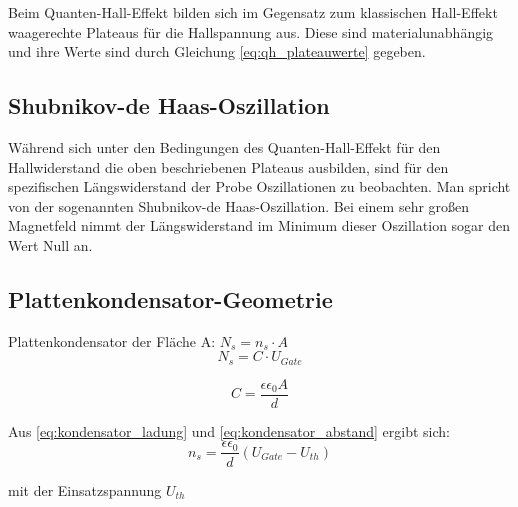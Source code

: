 Beim Quanten-Hall-Effekt bilden sich im Gegensatz zum klassischen Hall-Effekt waagerechte Plateaus für die Hallspannung aus. Diese sind materialunabhängig und ihre Werte sind durch Gleichung \ref{eq:qh_plateauwerte} gegeben. 





\subsection{Shubnikov-de Haas-Oszillation}

Während sich unter den Bedingungen des Quanten-Hall-Effekt für den Hallwiderstand die oben beschriebenen Plateaus ausbilden, sind für den spezifischen Längswiderstand der Probe Oszillationen zu beobachten. Man spricht von der sogenannten Shubnikov-de Haas-Oszillation. Bei einem sehr großen Magnetfeld nimmt der Längswiderstand im Minimum dieser Oszillation sogar den Wert Null an.





\subsection{Plattenkondensator-Geometrie}

Plattenkondensator der Fläche A: $N_s=n_s \cdot A$ 
\begin{equation}
N_s=C \cdot U_{Gate}
\label{eq:kondensator_ladung}
\end{equation}

\begin{equation}
C=\frac{\epsilon \epsilon_0 A}{d}
\label{eq:kondensator_abstand}
\end{equation}


Aus \ref{eq:kondensator_ladung} und \ref{eq:kondensator_abstand} ergibt sich:
\begin{equation}
n_s=\frac{\epsilon \epsilon_0}{d}(U_{Gate}-U_{th})
\label{eq:kondens_lad_und_abst}
\end{equation}

mit der Einsatzspannung $U_{th}$



